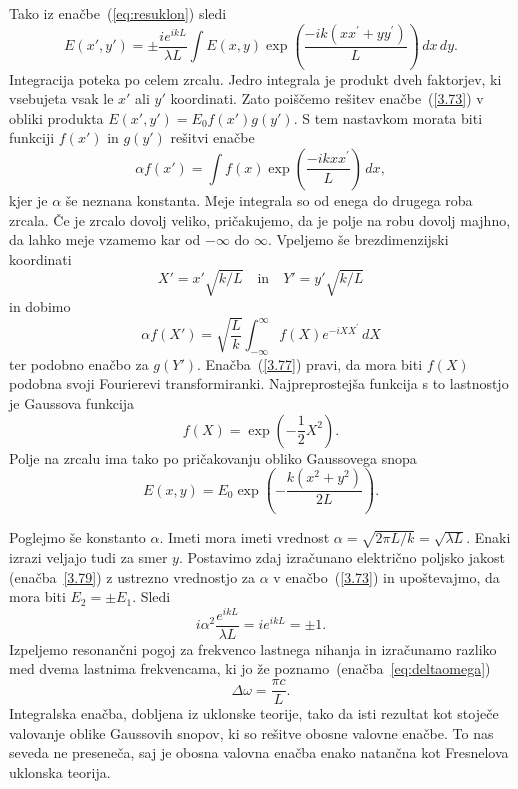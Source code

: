 Tako iz enačbe~(\ref{eq:resuklon})
sledi
\begin{equation}
E(x',y')=\pm\frac{ie^{ikL}}{\lambda L}\int E(x,y)\exp
\left(\frac{-ik(xx^{\prime}+yy^{\prime})}{L}\right)\, dx\, dy.
\label{3.73}
\end{equation}
Integracija poteka po celem zrcalu. Jedro integrala je produkt dveh
faktorjev, ki vsebujeta vsak le $x'$ ali $y'$ koordinati. Zato poiščemo
rešitev enačbe~(\ref{3.73}) v obliki produkta 
$
E(x',y')=E_{0}f(x')g(y').
$
S tem nastavkom morata biti funkciji $f(x')$ in $g(y')$ rešitvi enačbe
\begin{equation}
\alpha f(x')=\int f(x)\exp\left(\frac{-ikxx^{\prime}}{L}\right)\, dx,
\label{3.75}
\end{equation}
kjer je $\alpha$ še neznana konstanta. Meje integrala so od enega do 
drugega roba zrcala. Če je zrcalo dovolj veliko,
pričakujemo, da je polje na robu dovolj majhno, da lahko meje vzamemo
kar od $-\infty$ do $\infty$. Vpeljemo še brezdimenzijski koordinati
\begin{equation}
X'=x'\sqrt{k/L} \quad \mathrm{in} \quad Y'=y'\sqrt{k/L}
\label{3.76}
\end{equation}
in dobimo
\begin{equation}
\alpha f(X')=\sqrt{\frac{L}{k}}\int_{-\infty}^{\infty}f(X)e^{-iXX^{\prime}}\, dX
\label{3.77}
\end{equation}
ter podobno enačbo za $g(Y')$. Enačba~(\ref{3.77}) pravi, da mora
biti $f(X)$ podobna svoji Fourierevi transformiranki. Najpreprostejša
funkcija s to lastnostjo je Gaussova funkcija 
\begin{equation}
f(X)=\exp\left(-\frac{1}{2}X^{2}\right).
\label{3.78}
\end{equation}
Polje na zrcalu ima tako po pričakovanju obliko Gaussovega snopa
\begin{equation}
E(x,y)=E_{0}\exp\left(-\frac{k(x^{2}+y^{2})}{2L}\right).
\label{3.79}
\end{equation}

Poglejmo še konstanto $\alpha$. Imeti mora imeti vrednost 
$\alpha = \sqrt{2\pi L/k}=\sqrt{\lambda L}$.
Enaki izrazi veljajo tudi za smer $y$. Postavimo zdaj izračunano električno 
poljsko jakost (enačba~\ref{3.79}) z ustrezno vrednostjo za $\alpha$ v 
enačbo~(\ref{3.73}) in upoštevajmo, da mora biti
$E_{2}=\pm E_{1}$. Sledi
\begin{equation}
i\alpha^{2}\frac{e^{ikL}}{\lambda L}=ie^{ikL}=\pm1.
\label{3.80}
\end{equation}
Izpeljemo resonančni pogoj za
frekvenco lastnega nihanja in izračunamo razliko med dvema lastnima frekvencama, ki jo že poznamo~(enačba~\ref{eq:deltaomega})
\begin{equation}
\Delta \omega=\frac{\pi c}{L}.
\label{3.81}
\end{equation}
Integralska enačba, dobljena iz uklonske teorije, tako da
isti rezultat kot stoječe valovanje oblike Gaussovih snopov, ki so
rešitve obosne valovne enačbe. To nas seveda ne preseneča, saj je
obosna valovna enačba enako natančna kot Fresnelova uklonska teorija.

